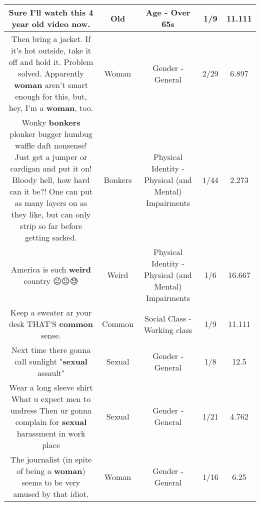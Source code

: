 \documentclass[11pt]{article}
\newlength\mylength
\begin{document}
\begin{center}
\begin{longtable}{|C{.65\mylength}|C{.30\mylength}|C{.12\mylength}|C{.12\mylength}|C{.12\mylength}|}
  \small Sure I'll watch this 4 year \textbf{old} video now.\normalsize   & Old & Age - Over 65s & 1/9 & 11.111 \\  \hline
  \small Then bring a jacket. If it's hot outside, take it off and hold it. Problem solved. Apparently \textbf{woman} aren't smart enough for this, but, hey, I'm a \textbf{woman}, too.\normalsize   & Woman & Gender - General & 2/29 & 6.897 \\  \hline
  \small Wonky \textbf{bonkers} plonker bugger humbug waffle daft nonsense! Just get a jumper or cardigan and put it on! Bloody hell, how hard can it be?! One can put as many layers on as they like, but can only strip so far before getting sacked.\normalsize   & Bonkers & Physical Identity - Physical (and Mental) Impairments & 1/44 & 2.273 \\  \hline
  \small America is such \textbf{weird} country 😐😐😓\normalsize   & Weird & Physical Identity - Physical (and Mental) Impairments & 1/6 & 16.667 \\  \hline
  \small Keep a sweater ar your desk THAT'S \textbf{common} sense.\normalsize   & Common & Social Class - Working class & 1/9 & 11.111 \\  \hline
  \small Next time there gonna call sunlight "\textbf{sexual} assault"\normalsize   & Sexual & Gender - General & 1/8 & 12.5 \\  \hline
  \small Wear a long sleeve shirt What u expect men to undress Then ur gonna complain for \textbf{sexual} harassment in work place\normalsize   & Sexual & Gender - General & 1/21 & 4.762 \\  \hline
  \small The journalist (in spite of being a \textbf{woman}) seems to be very amused by that idiot.\normalsize   & Woman & Gender - General & 1/16 & 6.25 \\  \hline

\end{longtable}
\end{center}
\end{document}
